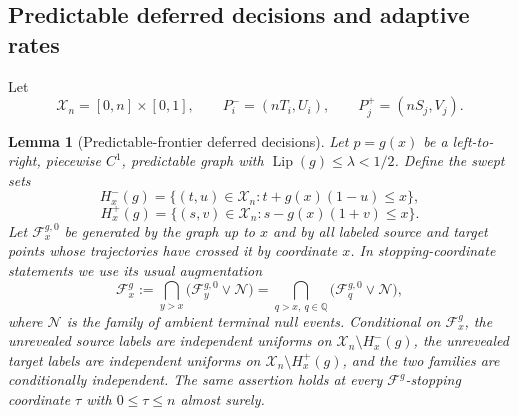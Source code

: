 \documentclass[11pt,reqno]{amsart}
\newtheorem{lemma}[theorem]{Lemma}
\theoremstyle{definition}
\theoremstyle{remark}
\numberwithin{equation}{section}
\newcommand{\Lip}{\operatorname{Lip}}
\begin{document}
\subsection{Predictable deferred decisions and adaptive rates}

Let
\[
\mathcal X_n=[0,n]\times[0,1],
\qquad
P_i^-=(nT_i,U_i),\qquad
P_j^+=(nS_j,V_j).
\]

\begin{lemma}[Predictable-frontier deferred decisions]
\label{lem:deferred}
Let \(p=g(x)\) be a left-to-right, piecewise \(C^1\), predictable graph
with \(\Lip(g)\le\lambda<1/2\).  Define the swept sets
\[
H_x^-(g)
=
\{(t,u)\in\mathcal X_n:t+g(x)(1-u)\le x\},
\]
\begin{equation}
H_x^+(g)
=
\{(s,v)\in\mathcal X_n:s-g(x)(1+v)\le x\}.
\label{eq:1.7}
\end{equation}
Let \(\mathcal F_x^{g,0}\) be generated by the graph up to \(x\) and by all
labeled source and target points whose trajectories have crossed it by
coordinate \(x\).  In stopping-coordinate statements we use its usual
augmentation
\[
\mathcal F_x^g
:=
\bigcap_{y>x}
\bigl(\mathcal F_y^{g,0}\vee\mathcal N\bigr)
=
\bigcap_{q>x,\ q\in\mathbb Q}
\bigl(\mathcal F_q^{g,0}\vee\mathcal N\bigr),
\]
where \(\mathcal N\) is the family of ambient terminal null events.
Conditional on \(\mathcal F_x^g\), the unrevealed
source labels are independent uniforms on
\(\mathcal X_n\setminus H_x^-(g)\), the unrevealed target labels are
independent uniforms on \(\mathcal X_n\setminus H_x^+(g)\), and the two
families are conditionally independent.  The same assertion holds at every
\(\mathcal F^g\)-stopping coordinate \(\tau\) with \(0\le\tau\le n\) almost
surely.
\end{lemma}
\end{document}
